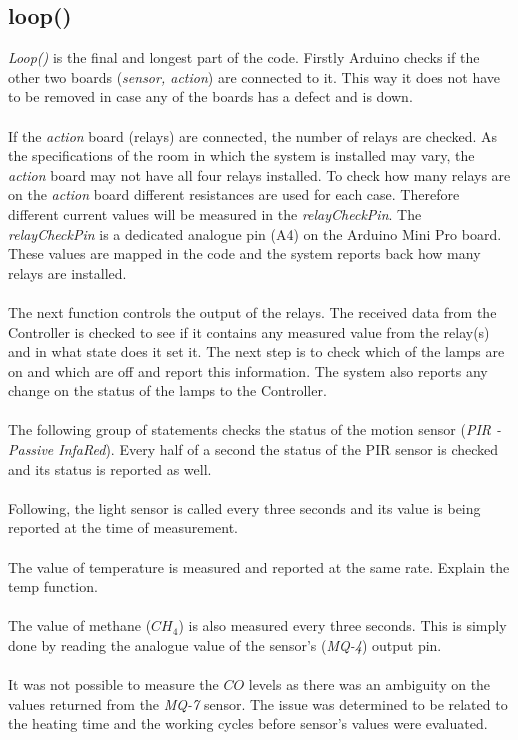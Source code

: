 \documentclass[12pt,a4paper,draft]{report}
\begin{document}
\subsection{loop()}
\textit{Loop()} is the final and longest part of the code.
Firstly Arduino checks if the other two boards (\textit{sensor, action}) are connected to it.
This way it does not have to be removed in case any of the boards has a defect and is down.\\ %
\ \\
If the \textit{action} board (relays) are connected, the number of relays are checked.
As the specifications of the room in which the system is installed may vary, the \textit{action} board may not have all four relays installed.
To check how many relays are on the \textit{action} board different resistances are used for each case.
Therefore different current values will be measured in the \textit{relayCheckPin}. 
The \textit{relayCheckPin} is a dedicated analogue pin (A4) on the Arduino Mini Pro board. %
These values are mapped in the code and the system reports back how many relays are installed.\\
\ \\
The next function controls the output of the relays.
The received data from the Controller is checked to see if it contains any measured value from the relay(s) and in what state does it set it. %
The next step is to check which of the lamps are on and which are off and report this information.
The system also reports any change on the status of the lamps to the Controller. \\
\ \\
The following group of statements checks the status of the motion sensor (\textit{PIR - Passive InfaRed}).
Every half of a second the status of the PIR sensor is checked and its status is reported as well.\\
\ \\
Following, the light sensor is called every three seconds and its value is being reported at the time of measurement.\\
\ \\
The value of temperature is measured and reported at the same rate.
Explain the temp function. \\ %
\ \\
The value of methane ($CH_4$) is also measured every three seconds.
This is simply done by reading the analogue value of the sensor's (\textit{MQ-4}) output pin.\\
\ \\
It was not possible to measure the $CO$ levels as there was an ambiguity on the values returned from the \textit{MQ-7} sensor.
The issue was determined to be related to the heating time and the working cycles before sensor's values were evaluated.\\
\ \\
%
\end{document}
